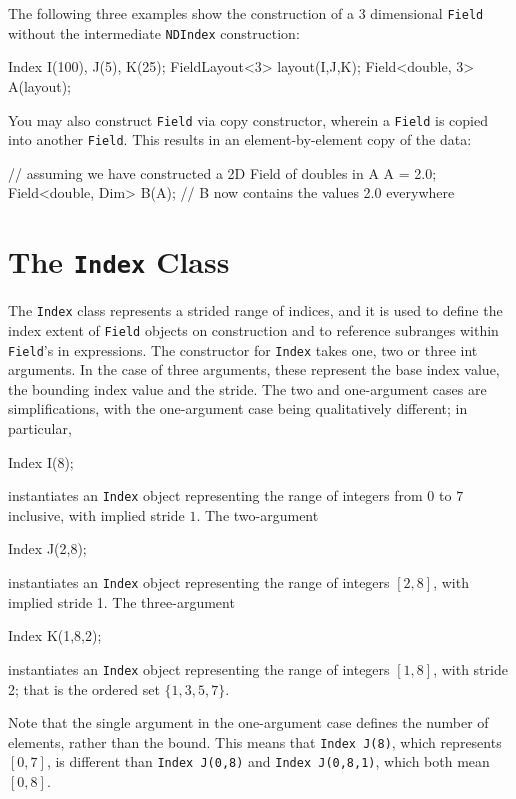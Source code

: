 The following three examples show the construction of a 3 dimensional \texttt{Field} without the intermediate \texttt{NDIndex} construction:
\begin{smallcode}
Index I(100), J(5), K(25);
FieldLayout<3> layout(I,J,K);
Field<double, 3> A(layout);
\end{smallcode}

You may also construct \texttt{Field} via copy constructor, wherein a \texttt{Field} is copied into another \texttt{Field}. This results in an element-by-element copy of the data: 
\begin{smallcode}
// assuming we have constructed a 2D Field of doubles in A
A = 2.0;
Field<double, Dim> B(A);
// B now contains the values 2.0 everywhere
\end{smallcode}

\section{The \texttt{Index} Class}

The \texttt{Index} class represents a strided range of indices, and it is used to define the index extent of \texttt{Field} objects on construction and to reference subranges within \texttt{Field}'s in expressions. The constructor for \texttt{Index} takes one, two or three int arguments. In the case of three arguments, these represent the base index value, the bounding index value and the stride. The two and one-argument cases are simplifications, with the one-argument case being qualitatively different; in
particular,
\begin{smallcode}
Index I(8);
\end{smallcode}
instantiates an \texttt{Index} object representing the range of integers from $0$ to $7$ inclusive, with implied stride $1$. The two-argument
\begin{smallcode}
Index J(2,8);
\end{smallcode}
instantiates an \texttt{Index} object representing the range of integers $[2,8]$, with implied stride 1. The three-argument
\begin{smallcode}
Index K(1,8,2);
\end{smallcode}
instantiates an \texttt{Index} object representing the range of integers $[1,8]$, with stride 2; that is the ordered set $\{1,3,5,7\}$.

Note that the single argument in the one-argument case defines the number of elements, rather than the bound. This means that \texttt{Index J(8)}, which represents $[0,7]$, is different than \texttt{Index J(0,8)} and \texttt{Index J(0,8,1)}, which both mean $[0,8]$.

